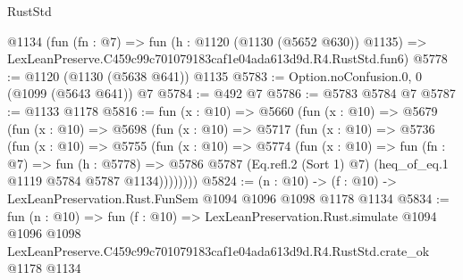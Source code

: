 \begin{lexlean}{RustStd}
\begin{coremodule}
    @1134
    (fun (fn : @7) =>
    fun (h : @1120 (@1130 (@5652 @630)) @1135) =>
    LexLeanPreserve.C459c99c701079183caf1e04ada613d9d.R4.RustStd.fun6)
@5778 := @1120 (@1130 (@5638 @641)) @1135
@5783 := Option.noConfusion.{0, 0} (@1099 (@5643 @641)) @7
@5784 := @492 @7
@5786 := @5783 @5784 @7
@5787 := @1133 @1178
@5816 := fun (x : @10) =>
  @5660
    (fun (x : @10) =>
    @5679
      (fun (x : @10) =>
      @5698
        (fun (x : @10) =>
        @5717
          (fun (x : @10) =>
          @5736
            (fun (x : @10) =>
            @5755
              (fun (x : @10) =>
              @5774
                (fun (x : @10) =>
                fun (fn : @7) =>
                fun (h : @5778) =>
                @5786 @5787 (Eq.refl.{2} (Sort 1) @7) (heq_of_eq.{1} @1119 @5784 @5787 @1134))))))))
@5824 := (n : @10) -> (f : @10) -> LexLeanPreservation.Rust.FunSem @1094 @1096 @1098 @1178 @1134
@5834 := fun (n : @10) =>
  fun (f : @10) =>
  LexLeanPreservation.Rust.simulate
    @1094
    @1096
    @1098
    LexLeanPreserve.C459c99c701079183caf1e04ada613d9d.R4.RustStd.crate_ok
    @1178
    @1134
\end{coremodule}
\end{lexlean}
